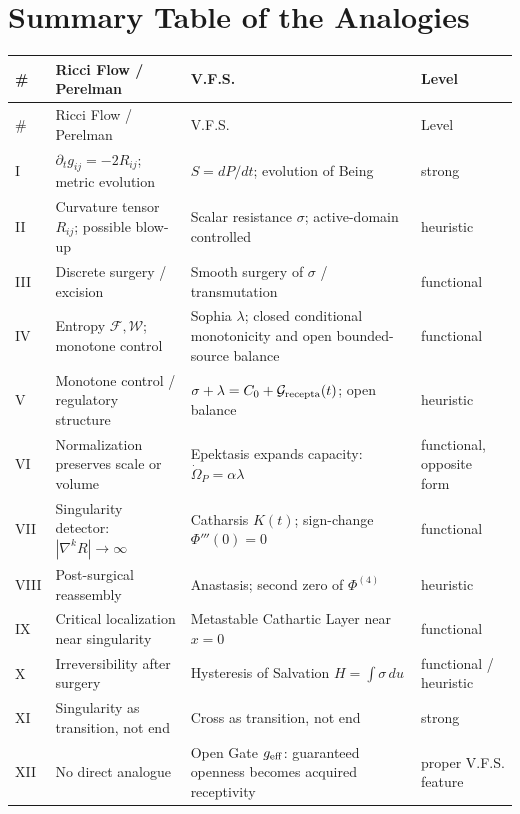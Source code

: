 \documentclass[11pt]{article}
\newcommand{\Grec}{\mathcal{G}_{\rm recepta}}
\newcommand{\Om}{\Omega_P}
\begin{document}
\section{Summary Table of the Analogies}

\begin{longtable}{>{\raggedright\arraybackslash}p{} >{\raggedright\arraybackslash}p{} >{\raggedright\arraybackslash}p{} >{\raggedright\arraybackslash}p{}}
\toprule
\# & Ricci Flow / Perelman & V.F.S. & Level \\
\midrule
\endfirsthead
\toprule
\# & Ricci Flow / Perelman & V.F.S. & Level \\
\midrule
\endhead
I & $\partial_t g_{ij}=-2R_{ij}$; metric evolution & $S=dP/dt$; evolution of Being & strong \\
II & Curvature tensor $R_{ij}$; possible blow-up & Scalar resistance $\sigma$; active-domain controlled & heuristic \\
III & Discrete surgery / excision & Smooth surgery of $\sigma$ / transmutation & functional \\
IV & Entropy $\mathcal F,\mathcal W$; monotone control & Sophia $\lambda$; closed conditional monotonicity and open bounded-source balance & functional \\
V & Monotone control / regulatory structure & $\sigma+\lambda=C_0+\Grec(t)$; open balance & heuristic \\
VI & Normalization preserves scale or volume & Epektasis expands capacity: $\dot\Om=\alpha\lambda$ & functional, opposite form \\
VII & Singularity detector: $|\nabla^k R|\to\infty$ & Catharsis $K(t)$; sign-change $\Phi'''(0)=0$ & functional \\
VIII & Post-surgical reassembly & Anastasis; second zero of $\Phi^{(4)}$ & heuristic \\
IX & Critical localization near singularity & Metastable Cathartic Layer near $x=0$ & functional \\
X & Irreversibility after surgery & Hysteresis of Salvation $H=\int\sigma\,du$ & functional / heuristic \\
XI & Singularity as transition, not end & Cross as transition, not end & strong \\
XII & No direct analogue & Open Gate $g_{\rm eff}$: guaranteed openness becomes acquired receptivity & proper V.F.S. feature \\
\bottomrule
\end{longtable}
\end{document}
